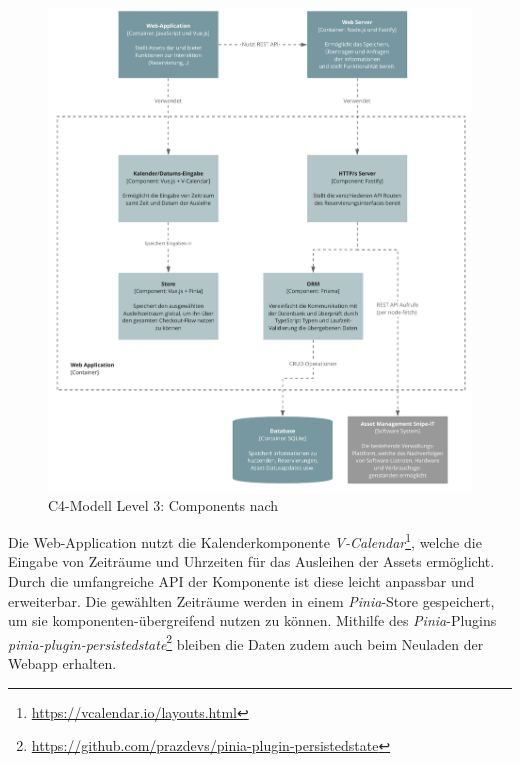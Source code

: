 \begin{figure}[h]
    \centering
    \includegraphics[scale=0.9]{Bilder/C4_3.pdf}
    \caption[C4-Modell Level 3: Components]{C4-Modell Level 3: Components nach }
    \label{fig:level3}
\end{figure}

Die Web-Application nutzt die Kalenderkomponente
\textit{V-Calendar}\footnote{\url{https://vcalendar.io/layouts.html}}, welche die Eingabe von
Zeiträume und Uhrzeiten für das Ausleihen der Assets ermöglicht. Durch die umfangreiche API der
Komponente ist diese leicht anpassbar und erweiterbar. Die gewählten Zeiträume werden in einem
\textit{Pinia}-Store gespeichert, um sie komponenten-übergreifend nutzen zu können. Mithilfe des
\textit{Pinia}-Plugins
\textit{pinia-plugin-persistedstate}\footnote{\url{https://github.com/prazdevs/pinia-plugin-persistedstate}}
bleiben die Daten zudem auch beim Neuladen der Webapp erhalten.



